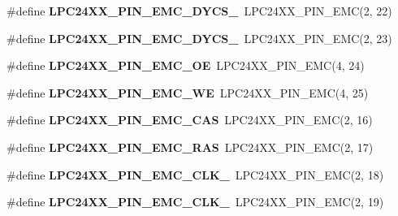 \begin{DoxyCompactItemize}
\item 
\mbox{\label{group__lpc24xx__io_ga4b5233d4d5870041c389affdbeac158e}} 
\#define {\bfseries L\+P\+C24\+X\+X\+\_\+\+P\+I\+N\+\_\+\+E\+M\+C\+\_\+\+D\+Y\+C\+S\+\_}~L\+P\+C24\+X\+X\+\_\+\+P\+I\+N\+\_\+\+E\+MC(2, 22)
\item 
\mbox{\label{group__lpc24xx__io_ga1e332bf570e079501ff68c1769cfe33b}} 
\#define {\bfseries L\+P\+C24\+X\+X\+\_\+\+P\+I\+N\+\_\+\+E\+M\+C\+\_\+\+D\+Y\+C\+S\+\_}~L\+P\+C24\+X\+X\+\_\+\+P\+I\+N\+\_\+\+E\+MC(2, 23)
\item 
\mbox{\label{group__lpc24xx__io_ga46192ec51912caae14b5bb5529fc7e48}} 
\#define {\bfseries L\+P\+C24\+X\+X\+\_\+\+P\+I\+N\+\_\+\+E\+M\+C\+\_\+\+OE}~L\+P\+C24\+X\+X\+\_\+\+P\+I\+N\+\_\+\+E\+MC(4, 24)
\item 
\mbox{\label{group__lpc24xx__io_gad7792f1f4962d460fc4203e1ae35581c}} 
\#define {\bfseries L\+P\+C24\+X\+X\+\_\+\+P\+I\+N\+\_\+\+E\+M\+C\+\_\+\+WE}~L\+P\+C24\+X\+X\+\_\+\+P\+I\+N\+\_\+\+E\+MC(4, 25)
\item 
\mbox{\label{group__lpc24xx__io_gacf1dcdb462a95fed87871bcd1ec8cf35}} 
\#define {\bfseries L\+P\+C24\+X\+X\+\_\+\+P\+I\+N\+\_\+\+E\+M\+C\+\_\+\+C\+AS}~L\+P\+C24\+X\+X\+\_\+\+P\+I\+N\+\_\+\+E\+MC(2, 16)
\item 
\mbox{\label{group__lpc24xx__io_gaa9a64cf97f20cc8bdb35d5901bb2fccb}} 
\#define {\bfseries L\+P\+C24\+X\+X\+\_\+\+P\+I\+N\+\_\+\+E\+M\+C\+\_\+\+R\+AS}~L\+P\+C24\+X\+X\+\_\+\+P\+I\+N\+\_\+\+E\+MC(2, 17)
\item 
\mbox{\label{group__lpc24xx__io_gaa4ca98658969001471f3b9563f9b9600}} 
\#define {\bfseries L\+P\+C24\+X\+X\+\_\+\+P\+I\+N\+\_\+\+E\+M\+C\+\_\+\+C\+L\+K\+\_}~L\+P\+C24\+X\+X\+\_\+\+P\+I\+N\+\_\+\+E\+MC(2, 18)
\item 
\mbox{\label{group__lpc24xx__io_ga62dc91ceebb74de6a942d31bd1535f57}} 
\#define {\bfseries L\+P\+C24\+X\+X\+\_\+\+P\+I\+N\+\_\+\+E\+M\+C\+\_\+\+C\+L\+K\+\_}~L\+P\+C24\+X\+X\+\_\+\+P\+I\+N\+\_\+\+E\+MC(2, 19)
\item 

\end{DoxyCompactItemize}
